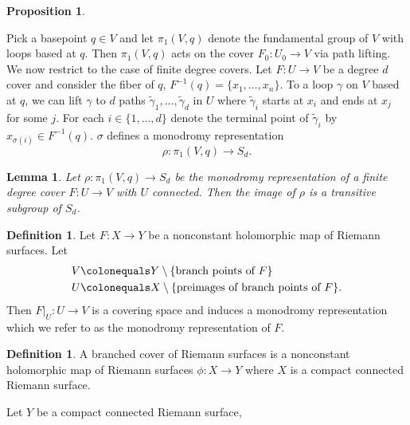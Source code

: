 \documentclass{dcthesis}
\newcommand{\defi}[1]{\textsf{#1}}
\newcommand{\wt}[1]{\widetilde{#1}}
\newcommand{\sm}{\setminus}
\numberwithin{equation}{section}
\newtheorem{prop}[equation]{Proposition}
\newtheorem{lemma}[equation]{Lemma}
\theoremstyle{definition}
\newtheorem{definition}[equation]{Definition}
\theoremstyle{remark}
\begin{document}
{{\begin{prop}
    \end{prop}
    Pick a basepoint $q\in V$
    and let $\pi_1(V,q)$ denote
    the \defi{fundamental group} of $V$
    with loops based at $q$.
    Then $\pi_1(V,q)$ acts on the cover
    $F_0\colon U_0\to V$
    via path lifting.
    We now restrict to the case of finite degree covers.
    Let $F\colon U\to V$ be a degree $d$ cover
    and consider the fiber of $q$,
    $F^{-1}(q) = \{x_1,\dots,x_n\}$.
    To a loop $\gamma$ on $V$ based at $q$,
    we can lift $\gamma$ to $d$ paths
    $\wt{\gamma}_1,\dots,\wt{\gamma}_d$
    in $U$ where $\wt{\gamma}_i$
    starts at $x_i$
    and ends at $x_j$ for some $j$.
    For each $i\in \{1,\ldots,d\}$ denote the terminal
    point of $\wt{\gamma}_i$ by $x_{\sigma(i)}\in F^{-1}(q)$.
    $\sigma$ defines
    a \defi{monodromy representation}
    \begin{equation}
      \label{eqn:monodromyrep}
      \rho\colon
      \pi_1(V,q)\to S_d.
    \end{equation}
    \begin{lemma}
      \label{lem:transitive}
      Let $\rho\colon\pi_1(V,q)\to S_d$
      be the monodromy representation
      of a
      finite degree cover $F\colon U\to V$
      with $U$ connected.
      Then the image of $\rho$
      is a transitive subgroup of $S_d$.
    \end{lemma}
    \begin{definition}
      \label{def:monodromyrepofholomorphicmap}
      Let $F\colon X\to Y$ be a nonconstant holomorphic
      map of Riemann surfaces.
      Let
      \begin{align*}
        V &\colonequals Y\sm \{\text{branch points of $F$}\}\\
        U &\colonequals X\sm \{\text{preimages of branch points of $F$}\}.
      \end{align*}
      Then $F|_U\colon U\to V$ is a covering space
      and induces a monodromy representation
      which we refer to as the
      \defi{monodromy representation of $F$}.
    \end{definition}
    \begin{definition}
      \label{def:branchedcoverofriemannsurface}
      A \defi{branched cover of Riemann surfaces} is a nonconstant holomorphic map
      of Riemann surfaces
      $\phi\colon X\to Y$ where $X$ is a compact connected Riemann surface.
    \end{definition}
    Let $Y$ be a compact connected Riemann surface,
}}
\end{document}
